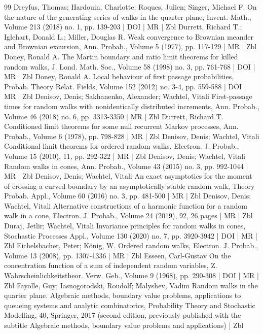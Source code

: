 \begin{thebibliography}{99}
Dreyfus, Thomas; Hardouin, Charlotte; Roques, Julien; Singer, Michael F. On the nature of the generating series of walks in the quarter plane, Invent. Math., Volume 213 (2018) no. 1, pp. 139-203 | DOI | MR | Zbl
Durrett, Richard T.; Iglehart, Donald L.; Miller, Douglas R. Weak convergence to Brownian meander and Brownian excursion, Ann. Probab., Volume 5 (1977), pp. 117-129 | MR | Zbl
Doney, Ronald A. The Martin boundary and ratio limit theorems for killed random walks, J. Lond. Math. Soc., Volume 58 (1998) no. 3, pp. 761-768 | DOI | MR | Zbl
Doney, Ronald A. Local behaviour of first passage probabilities, Probab. Theory Relat. Fields, Volume 152 (2012) no. 3-4, pp. 559-588 | DOI | MR | Zbl
Denisov, Denis; Sakhanenko, Alexander; Wachtel, Vitali First-passage times for random walks with nonidentically distributed increments, Ann. Probab., Volume 46 (2018) no. 6, pp. 3313-3350 | MR | Zbl
Durrett, Richard T. Conditioned limit theorems for some null recurrent Markov processes, Ann. Probab., Volume 6 (1978), pp. 798-828 | MR | Zbl
Denisov, Denis; Wachtel, Vitali Conditional limit theorems for ordered random walks, Electron. J. Probab., Volume 15 (2010), 11, pp. 292-322 | MR | Zbl
Denisov, Denis; Wachtel, Vitali Random walks in cones, Ann. Probab., Volume 43 (2015) no. 3, pp. 992-1044 | MR | Zbl
Denisov, Denis; Wachtel, Vitali An exact asymptotics for the moment of crossing a curved boundary by an asymptotically stable random walk, Theory Probab. Appl., Volume 60 (2016) no. 3, pp. 481-500 | MR | Zbl
Denisov, Denis; Wachtel, Vitali Alternative constructions of a harmonic function for a random walk in a cone, Electron. J. Probab., Volume 24 (2019), 92, 26 pages | MR | Zbl
Duraj, Jetlir; Wachtel, Vitali Invariance principles for random walks in cones, Stochastic Processes Appl., Volume 130 (2020) no. 7, pp. 3920-3942 | DOI | MR | Zbl
Eichelsbacher, Peter; König, W. Ordered random walks, Electron. J. Probab., Volume 13 (2008), pp. 1307-1336 | MR | Zbl
Esseen, Carl-Gustav On the concentration function of a sum of independent random variables, Z. Wahrscheinlichkeitstheor. Verw. Geb., Volume 9 (1968), pp. 290-308 | DOI | MR | Zbl
Fayolle, Guy; Iasnogorodski, Roudolf; Malyshev, Vadim Random walks in the quarter plane. Algebraic methods, boundary value problems, applications to queueing systems and analytic combinatorics, Probability Theory and Stochastic Modelling, 40, Springer, 2017 (second edition, previously published with the subtitle Algebraic methods, boundary value problems and applications) | Zbl

\end{thebibliography}
